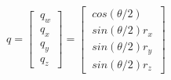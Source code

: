 \documentclass[preview]{standalone}
\begin{document}
\begin{center}
$q = \begin{bmatrix}\
                q_w \\\
                q_x \\\
                q_y \\\
                q_z\
            \end{bmatrix} = \begin{bmatrix}\
                cos(\theta/2) \\\
                sin(\theta/2)r_{x} \\ \
                sin(\theta/2)r_{y} \\ \
                sin(\theta/2)r_{z}\
            \end{bmatrix}$
\end{center}
\end{document}
